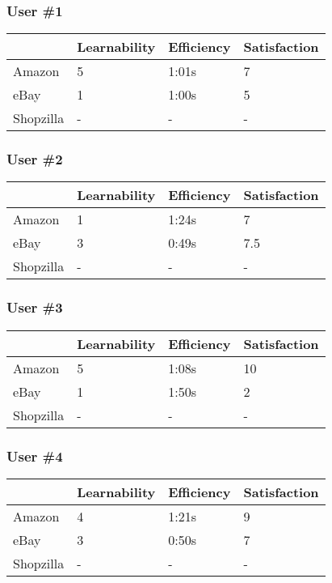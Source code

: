 \documentclass[11pt, oneside]{article}   	%
\begin{document}
\subsubsection{User \#1}

\begin{tabular}{| l | l | l | l |}
    \hline
     & Learnability & Efficiency & Satisfaction \\ \hline
    Amazon & 5 & 1:01s & 7 \\ \hline
    eBay & 1 & 1:00s & 5 \\ \hline
    Shopzilla & - & - & - \\\hline
\end{tabular}

\subsubsection{User \#2}

\begin{tabular}{| l | l | l | l |}
    \hline
     & Learnability & Efficiency & Satisfaction \\ \hline
    Amazon & 1 & 1:24s & 7 \\ \hline
    eBay & 3 & 0:49s & 7.5 \\ \hline
    Shopzilla & - & - & - \\\hline
\end{tabular}

\subsubsection{User \#3}

\begin{tabular}{| l | l | l | l |}
    \hline
     & Learnability & Efficiency & Satisfaction \\ \hline
    Amazon & 5 & 1:08s & 10 \\ \hline
    eBay & 1 & 1:50s & 2 \\ \hline
    Shopzilla & - & - & - \\\hline
\end{tabular}

\subsubsection{User \#4}

\begin{tabular}{| l | l | l | l |}
    \hline
     & Learnability & Efficiency & Satisfaction \\ \hline
    Amazon & 4 & 1:21s & 9 \\ \hline
    eBay & 3 & 0:50s & 7 \\ \hline
    Shopzilla & - & - & - \\\hline
\end{tabular}
\end{document}
